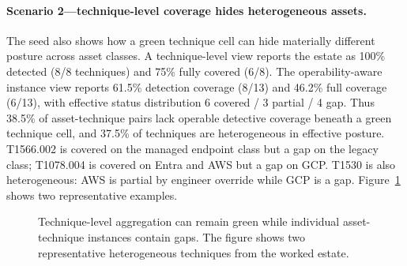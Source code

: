 \documentclass[10pt]{article}
\begin{document}
\paragraph{Scenario 2---technique-level coverage hides heterogeneous assets.} The seed also shows how a green technique cell can hide materially different posture across asset classes. A technique-level view reports the estate as 100\% detected (8/8 techniques) and 75\% fully covered (6/8). The operability-aware instance view reports 61.5\% detection coverage (8/13) and 46.2\% full coverage (6/13), with effective status distribution 6 covered / 3 partial / 4 gap. Thus 38.5\% of asset-technique pairs lack operable detective coverage beneath a green technique cell, and 37.5\% of techniques are heterogeneous in effective posture. T1566.002 is covered on the managed endpoint class but a gap on the legacy class; T1078.004 is covered on Entra and AWS but a gap on GCP. T1530 is also heterogeneous: AWS is partial by engineer override while GCP is a gap. Figure~\ref{fig:aggregation} shows two representative examples.

\begin{figure}[H]
\centering
{}
\caption{Technique-level aggregation can remain green while individual asset-technique instances contain gaps. The figure shows two representative heterogeneous techniques from the worked estate.}
\label{fig:aggregation}
\end{figure}
\end{document}
